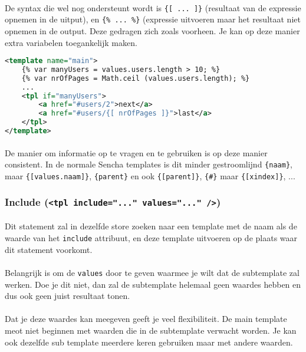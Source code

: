 \paragraph {} De syntax die wel nog ondersteunt wordt is \lstinline|{[ ... ]}| (resultaat
van de expressie opnemen in de uitput), en \lstinline|{% ... %}| (expressie uitvoeren maar
het resultaat niet opnemen in de output. Deze gedragen zich zoals voorheen. Je kan op deze
manier extra variabelen toegankelijk maken.

\begin{lstlisting}[language=xml]
<template name="main">
	{% var manyUsers = values.users.length > 10; %}
	{% var nrOfPages = Math.ceil (values.users.length); %}
	...
	<tpl if="manyUsers">
		<a href="#users/2">next</a>
		<a href="#users/{[ nrOfPages ]}">last</a>
	</tpl>
</template>
\end{lstlisting}

\paragraph {} De manier om informatie op te vragen en te gebruiken is op deze manier
consistent. In de normale Sencha templates is dit minder gestroomlijnd \lstinline|{naam}|,
maar \lstinline|{[values.naam]}|, \lstinline|{parent}| en ook \lstinline|{[parent]}|,
\lstinline|{#}| maar \lstinline|{[xindex]}|, ...


\subsubsection {Include (\lstinline{<tpl include="..." values="..." />})}

\paragraph {} Dit statement zal in dezelfde store zoeken naar een template met de naam als
de waarde van het \lstinline{include} attribuut, en deze template uitvoeren op de plaats
waar dit statement voorkomt.

\paragraph {} Belangrijk is om de \lstinline{values} door te geven waarmee je wilt dat de
subtemplate zal werken. Doe je dit niet, dan zal de subtemplate helemaal geen waardes
hebben en dus ook geen juist resultaat tonen.

\paragraph {} Dat je deze waardes kan meegeven geeft je veel flexibiliteit. De main
template meot niet beginnen met waarden die in de subtemplate verwacht worden. Je kan ook
dezelfde sub template meerdere keren gebruiken maar met andere waarden.

